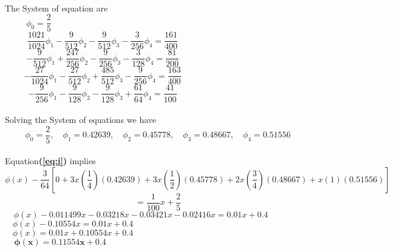 \documentclass[a4paper,12pt]{report}
\newcommand{\spn}[1]{\\[#1cm]}
\newcommand{\refn}[1]{\textbf{(\ref{#1})}}
\begin{document}
	\\The System of equation are\spn{-.6}
	\begin{equation}
		\phi_0 = \frac{2}{5}\qquad\qquad\qquad\qquad\qquad\qquad\qquad\qquad\qquad\qquad\qquad\qquad\qquad\qquad \tag{i}
	\end{equation}
	\begin{equation}
		\frac{1021}{1024}\phi_1 - \frac{9}{512}\phi_2 - \frac{9}{512}\phi_3 - \frac{3}{256}\phi_4 = \frac{161}{400}\qquad\qquad\qquad\qquad\qquad\qquad\quad \tag{ii}
	\end{equation}
	\begin{equation}
		-\frac{9}{512}\phi_1 + \frac{247}{256}\phi_2 - \frac{9}{256}\phi_3 - \frac{3}{128}\phi_4 = \frac{81}{200}\qquad\qquad\qquad\qquad\qquad\qquad\quad \tag{iii}
	\end{equation}
	\begin{equation}
		-\frac{27}{1024}\phi_1 - \frac{27}{512}\phi_2 + \frac{485}{512}\phi_3 - \frac{9}{256}\phi_4 = \frac{163}{400}\qquad\qquad\qquad\qquad\qquad\qquad\quad \tag{iv}
	\end{equation}
	\begin{equation}
		-\frac{9}{256}\phi_1 - \frac{9}{128}\phi_2 - \frac{9}{128}\phi_3 + \frac{61}{64}\phi_4 = \frac{41}{100}\qquad\qquad\qquad\qquad\qquad\qquad\quad \tag{v}
	\end{equation}
	\\Solving the System of equations we have
	$$
		\phi_0=\frac{2}{5},\quad \phi_1=0.42639,\quad \phi_2=0.45778,\quad \phi_3=0.48667,\quad \phi_4=0.51556
	$$
	\spn{-.5}Equation\refn{eq:i} implies
	$$
		\phi(x) - \frac{3}{64} \left[ 0 + 3x\left(\frac{1}{4}\right)(0.42639) + 3x\left(\frac{1}{2}\right)(0.45778) + 2x\left(\frac{3}{4}\right)(0.48667) + x(1)(0.51556)\right]
	$$
	$$
		= \frac{1}{100}x + \frac{2}{5}
	$$
	$$
		\phi(x) - 0.011499x - 0.03218x - 0.03421x - 0.02416x = 0.01x + 0.4\qquad\qquad
	$$
	$$
		\phi(x) - 0.10554x = 0.01x + 0.4\qquad\qquad\qquad\qquad\qquad\qquad\qquad\qquad\qquad\qquad
	$$
	$$
		\phi(x) = 0.01x + 0.10554x + 0.4\qquad\qquad\qquad\qquad\qquad\qquad\qquad\qquad\qquad\qquad
	$$
	$$
		\mathbf{\phi(x) = 0.11554x + 0.4} \qquad\qquad\qquad\qquad\qquad\qquad\qquad\qquad\qquad\qquad\qquad\quad
	$$
\end{document}
